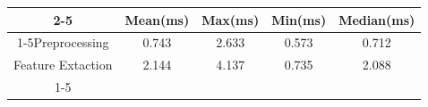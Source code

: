 \documentclass{standalone}
\begin{document}
 
 \begin{tabular}{|c |c |c |c |c |}
\cline{2-5}\cline{2-5} \multicolumn{1}{c |}{ } & Mean(ms) & Max(ms) & Min(ms) & Median(ms)\\ 
\cline{1-5}Preprocessing & 0.743 & 2.633 & 0.573 & 0.712\\ 
 \hhline{|=|=|=|=|=|}Feature Extaction & 2.144 & 4.137 & 0.735 & 2.088\\ 
 \cline{1-5}\hline \end{tabular}
 
\end{document}
